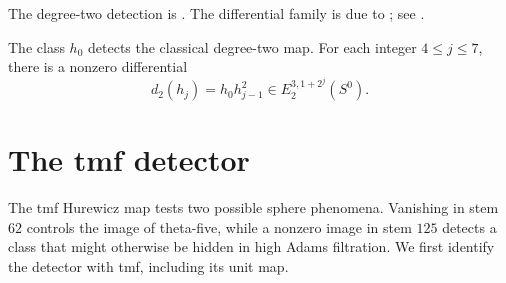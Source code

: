 \begin{theorem}
\label{sem:Literature:one-line-differentials}
The degree-two detection is \cite[Lemma 2.3]{Adams58}. The differential family is due to \cite{Adams60}; see \cite[Theorem 1.2]{BurklundXu}.\par

The class $h_0$ detects the classical degree-two map. For each integer $4\le j\le7$, there is a nonzero differential
\[d_2(h_j)=h_0h_{j-1}^2\in E_2^{3,1+2^j}(S^0).\]


\end{theorem}

\section{The tmf detector}
The tmf Hurewicz map tests two possible sphere phenomena. Vanishing in
stem $62$ controls the image of theta-five, while a nonzero image in
stem $125$ detects a class that might otherwise be hidden in high Adams
filtration. We first identify the detector with tmf, including its unit
map.

